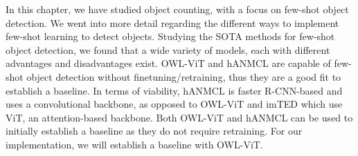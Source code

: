 In this chapter, we have studied object counting, with a focus on few-shot object detection. We went into more detail regarding the different ways to implement few-shot learning to detect objects. Studying the SOTA methods for few-shot object detection, we found that a wide variety of models, each with different advantages and disadvantages exist. OWL-ViT and hANMCL are capable of few-shot object detection without finetuning/retraining, thus they are a good fit to establish a baseline. In terms of viability, hANMCL is faster R-CNN-based and uses a convolutional backbone, as opposed to OWL-ViT and imTED which use ViT, an attention-based backbone. Both OWL-ViT and hANMCL can be used to initially establish a baseline as they do not require retraining. For our implementation, we will establish a baseline with OWL-ViT.